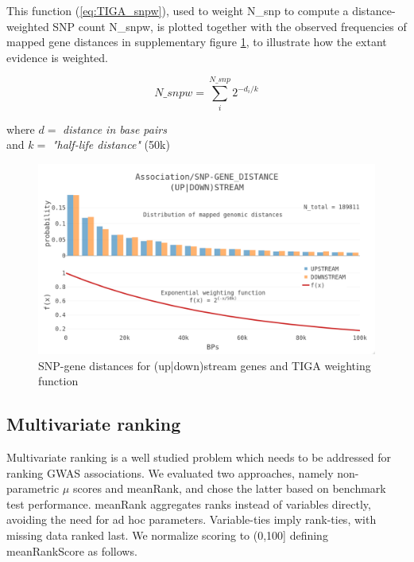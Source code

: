 This function (\ref{eq:TIGA_snpw}), used to weight N\_snp to compute a distance-weighted SNP count N\_snpw, is plotted together with the observed frequencies of mapped gene distances in supplementary figure \ref{fig:TIGA_Sup02}, to illustrate how the extant evidence is weighted. 

\begin{equation}
    N\_snpw = \sum_{i}^{N\_snp}  2^{-d_{i}/k}
    \label{eq:TIGA_snpw}
\end{equation}

\begin{center}
    where $ d = $ \emph{distance in base pairs}\\
    and $ k = $ \emph{"half-life distance"} (50k)
\end{center}

\begin{figure}
	\includegraphics[width=\textwidth]{figures/tiga/SupFIG02_distance_weighting_function.jpg}
	\caption{SNP-gene distances for (up|down)stream genes and TIGA weighting function}
	\label{fig:TIGA_Sup02}
\end{figure}

\subsection{Multivariate ranking}

Multivariate ranking is a well studied problem which needs to be addressed for ranking GWAS associations. We evaluated two approaches, namely non-parametric $\mu$ scores\cite{Wittkowski2008-mz} and meanRank, and chose the latter based on benchmark test performance. meanRank aggregates ranks instead of variables directly, avoiding the need for ad hoc parameters. Variable-ties imply rank-ties, with missing data ranked last. We normalize scoring to (0,100] defining meanRankScore as follows.

